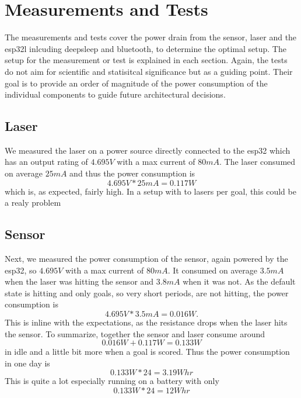 \section{Measurements and Tests}
The measurements and tests cover the power drain from the sensor, laser and the esp32l inlcuding deepsleep and bluetooth, to determine the optimal setup. The setup for the measurement or test is explained in each section. Again, the tests do not aim for scientific and statisitcal significance but as a guiding point. Their goal is to provide an order of magnitude of the power consumption of the individual components to guide future architectural decisions. 


\subsection{Laser}
We measured the laser on a power source directly connected to the esp32 which has an output rating of $4.695V$ with a max current of $80mA$. The laser consumed on average $25mA$ and thus the power consumption is
\begin{equation*}
    4.695V * 25mA = 0.117W
\end{equation*}
which is, as expected, fairly high. In a setup with to lasers per goal, this could be a realy problem


\subsection{Sensor}
Next, we measured the power consumption of the sensor, again powered by the esp32, so $4.695V$ with a max current of $80mA$. It consumed on average $3.5mA$ when the laser was hitting the sensor and $3.8mA$ when it was not. As the default state is hitting and only goals, so very short periods, are not hitting, the power consumption is
  \begin{equation*}
      4.695V * 3.5mA = 0.016W.
    \end{equation*}
This is inline with the expectations, as the resistance drops when the laser hits the sensor. 
To summarize, together the sensor and laser consume around  
\begin{equation*}
    0.016W + 0.117W = 0.133W
  \end{equation*}
in idle and a little bit more when a goal is scored. Thus the power consumption in one day is
\begin{equation*}
    0.133W * 24 = 3.19Whr
\end{equation*}
This is quite a lot especially running on a battery with only
\begin{equation*}
    0.133W * 24 = 12Whr
\end{equation*}

